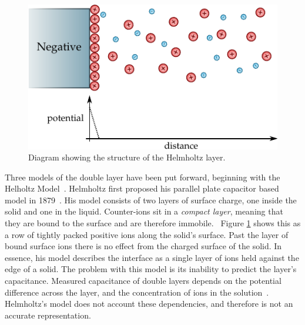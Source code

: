 
    \begin{figure}
      \begin{center}
        \includegraphics{content/introduction/graphics/model_helmholtz}
      \end{center}
      \caption{Diagram showing the structure of the Helmholtz layer.}
      \label{fig:doubleLayerModel_helmholtz}
    \end{figure}
    Three models of the double layer have been put forward, beginning with the Helholtz Model~\cite{Horch2004}.
    Helmholtz first proposed his parallel plate capacitor based model in 1879~\cite{Geddes1997}.
    His model consists of two layers of surface charge, one inside the solid and one in the liquid.
    Counter-ions sit in a \emph{compact layer}, meaning that they are bound to the surface and are therefore immobile.~\cite{Salieb-Beugelaar2009}
    Figure \ref{fig:doubleLayerModel_helmholtz} shows this as a row of tightly packed positive ions along the solid's surface.
    Past the layer of bound surface ions there is no effect from the charged surface of the solid.
    In essence, his model describes the interface as a single layer of ions held against the edge of a solid.
    The problem with this model is its inability to predict the layer's capacitance.
    Measured capacitance of double layers depends on the potential difference across the layer, and the concentration of ions in the solution~\cite{Bard1980}.
    Helmholtz's model does not account these dependencies, and therefore is not an accurate representation.

